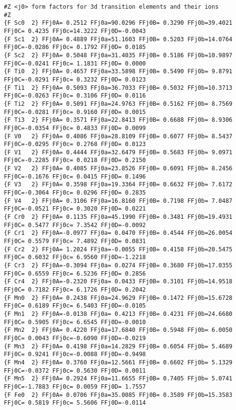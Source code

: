 {\begin{verbatim}
#Z <j0> form factors for 3d transition elements and their ions
#Z
{F Sc0  2} FFj0A= 0.2512 FFj0a=90.0296 FFj0B= 0.3290 FFj0b=39.4021 FFj0C= 0.4235 FFj0c=14.3222 FFj0D=-0.0043 
{F Sc1  2} FFj0A= 0.4889 FFj0a=51.1603 FFj0B= 0.5203 FFj0b=14.0764 FFj0C=-0.0286 FFj0c= 0.1792 FFj0D= 0.0185 
{F Sc2  2} FFj0A= 0.5048 FFj0a=31.4035 FFj0B= 0.5186 FFj0b=10.9897 FFj0C=-0.0241 FFj0c= 1.1831 FFj0D= 0.0000 
{F Ti0  2} FFj0A= 0.4657 FFj0a=33.5898 FFj0B= 0.5490 FFj0b= 9.8791 FFj0C=-0.0291 FFj0c= 0.3232 FFj0D= 0.0123 
{F Ti1  2} FFj0A= 0.5093 FFj0a=36.7033 FFj0B= 0.5032 FFj0b=10.3713 FFj0C=-0.0263 FFj0c= 0.3106 FFj0D= 0.0116 
{F Ti2  2} FFj0A= 0.5091 FFj0a=24.9763 FFj0B= 0.5162 FFj0b= 8.7569 FFj0C=-0.0281 FFj0c= 0.9160 FFj0D= 0.0015 
{F Ti3  2} FFj0A= 0.3571 FFj0a=22.8413 FFj0B= 0.6688 FFj0b= 8.9306 FFj0C=-0.0354 FFj0c= 0.4833 FFj0D= 0.0099 
{F V0   2} FFj0A= 0.4086 FFj0a=28.8109 FFj0B= 0.6077 FFj0b= 8.5437 FFj0C=-0.0295 FFj0c= 0.2768 FFj0D= 0.0123 
{F V1   2} FFj0A= 0.4444 FFj0a=32.6479 FFj0B= 0.5683 FFj0b= 9.0971 FFj0C=-0.2285 FFj0c= 0.0218 FFj0D= 0.2150 
{F V2   2} FFj0A= 0.4085 FFj0a=23.8526 FFj0B= 0.6091 FFj0b= 8.2456 FFj0C=-0.1676 FFj0c= 0.0415 FFj0D= 0.1496 
{F V3   2} FFj0A= 0.3598 FFj0a=19.3364 FFj0B= 0.6632 FFj0b= 7.6172 FFj0C=-0.3064 FFj0c= 0.0296 FFj0D= 0.2835 
{F V4   2} FFj0A= 0.3106 FFj0a=16.8160 FFj0B= 0.7198 FFj0b= 7.0487 FFj0C=-0.0521 FFj0c= 0.3020 FFj0D= 0.0221 
{F Cr0  2} FFj0A= 0.1135 FFj0a=45.1990 FFj0B= 0.3481 FFj0b=19.4931 FFj0C= 0.5477 FFj0c= 7.3542 FFj0D=-0.0092 
{F Cr1  2} FFj0A=-0.0977 FFj0a= 0.0470 FFj0B= 0.4544 FFj0b=26.0054 FFj0C= 0.5579 FFj0c= 7.4892 FFj0D= 0.0831 
{F Cr2  2} FFj0A= 1.2024 FFj0a=-0.0055 FFj0B= 0.4158 FFj0b=20.5475 FFj0C= 0.6032 FFj0c= 6.9560 FFj0D=-1.2218 
{F Cr3  2} FFj0A=-0.3094 FFj0a= 0.0274 FFj0B= 0.3680 FFj0b=17.0355 FFj0C= 0.6559 FFj0c= 6.5236 FFj0D= 0.2856 
{F Cr4  2} FFj0A=-0.2320 FFj0a= 0.0433 FFj0B= 0.3101 FFj0b=14.9518 FFj0C= 0.7182 FFj0c= 6.1726 FFj0D= 0.2042 
{F Mn0  2} FFj0A= 0.2438 FFj0a=24.9629 FFj0B= 0.1472 FFj0b=15.6728 FFj0C= 0.6189 FFj0c= 6.5403 FFj0D=-0.0105 
{F Mn1  2} FFj0A=-0.0138 FFj0a= 0.4213 FFj0B= 0.4231 FFj0b=24.6680 FFj0C= 0.5905 FFj0c= 6.6545 FFj0D=-0.0010 
{F Mn2  2} FFj0A= 0.4220 FFj0a=17.6840 FFj0B= 0.5948 FFj0b= 6.0050 FFj0C= 0.0043 FFj0c=-0.6090 FFj0D=-0.0219 
{F Mn3  2} FFj0A= 0.4198 FFj0a=14.2829 FFj0B= 0.6054 FFj0b= 5.4689 FFj0C= 0.9241 FFj0c=-0.0088 FFj0D=-0.9498 
{F Mn4  2} FFj0A= 0.3760 FFj0a=12.5661 FFj0B= 0.6602 FFj0b= 5.1329 FFj0C=-0.0372 FFj0c= 0.5630 FFj0D= 0.0011 
{F Mn5  2} FFj0A= 0.2924 FFj0a=11.6655 FFj0B= 0.7405 FFj0b= 5.0741 FFj0C=-1.7883 FFj0c= 0.0059 FFj0D= 1.7557 
{F Fe0  2} FFj0A= 0.0706 FFj0a=35.0085 FFj0B= 0.3589 FFj0b=15.3583 FFj0C= 0.5819 FFj0c= 5.5606 FFj0D=-0.0114 

\end{verbatim}}
